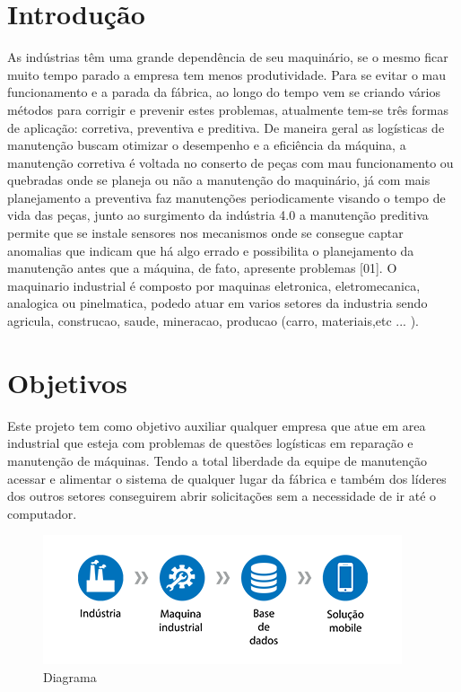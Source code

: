 \documentclass[%
  a4paper,%
  12pt,%
  english,%
  brazilian,%
]{article}
\begin{document}
\section{Introdução}%
As indústrias têm uma grande dependência de seu maquinário, se o mesmo ficar muito tempo parado a empresa tem menos produtividade. Para se evitar o mau funcionamento e a parada da fábrica, ao longo do tempo vem se criando vários métodos para corrigir e prevenir estes problemas, atualmente tem-se três formas de aplicação: corretiva, preventiva e preditiva. De maneira geral as logísticas de manutenção buscam otimizar o desempenho e a eficiência da máquina, a manutenção corretiva é voltada no conserto de peças com mau funcionamento ou quebradas onde se planeja ou não a manutenção do maquinário, já com mais planejamento a preventiva faz manutenções periodicamente visando o tempo de vida das peças, junto ao surgimento da indústria 4.0 a manutenção preditiva permite que se instale sensores nos mecanismos onde se consegue captar anomalias que indicam que há algo errado e possibilita o planejamento da manutenção antes que a máquina, de fato, apresente problemas [01]. O maquinario industrial é composto por maquinas eletronica, eletromecanica, analogica ou pinelmatica, podedo atuar em varios setores da industria sendo agricula, construcao, saude, mineracao, producao (carro, materiais,etc ... ).


\section{Objetivos}%
Este projeto tem como objetivo auxiliar qualquer empresa que atue em area industrial que esteja com problemas de questões logísticas em reparação e manutenção de máquinas. Tendo a total liberdade da equipe de manutenção acessar e alimentar o sistema de qualquer lugar da fábrica e  também dos líderes dos outros setores conseguirem abrir solicitações sem a necessidade de ir até o computador.


\begin{figure}[!htb]
\includegraphics[width = 0.95\linewidth]{Figures/1.png}
\caption{Diagrama}%
\end{figure}
\end{document}
